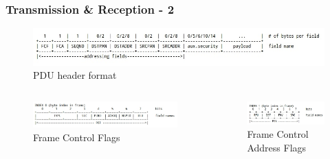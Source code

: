 \begin{frame}[fragile]
  \frametitle{Transmission \& Reception - 2}
  \begin{figure}
  	\centering
  	\includegraphics[width=\textwidth]{img/header.jpg}
  	\caption{PDU header format}
  \end{figure}
  \begin{columns}
  	\begin{column}{.52\textwidth}
	    \begin{figure}
	    	\includegraphics[width=\textwidth]{img/fcf.jpg}
  		\caption{Frame Control Flags}
	    \end{figure}
  	\end{column}
  	\hfill
	\begin{column}{.45\textwidth}
	    \begin{figure}
	    	\includegraphics[width=\textwidth]{img/fca.jpg}
  		\caption{Frame Control Address Flags}
	    \end{figure}
  	\end{column}
  \end{columns}
\end{frame}
% 

